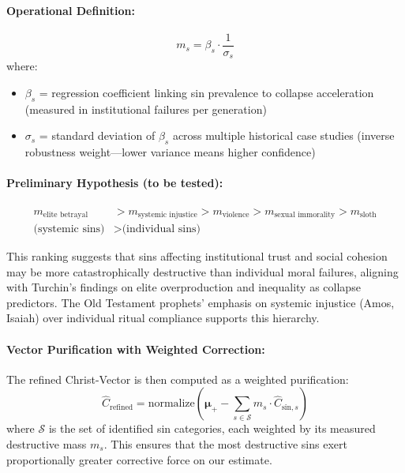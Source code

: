 \documentclass[11pt,a4paper]{article}
\theoremstyle{definition}
\theoremstyle{remark}
\begin{document}
\begin{small}
\paragraph{Operational Definition:}
\begin{equation}
m_s = \beta_s \cdot \frac{1}{\sigma_s}
\end{equation}
where:
\begin{itemize}
    \item \(\beta_s\) = regression coefficient linking sin prevalence to collapse acceleration (measured in institutional failures per generation)
    \item \(\sigma_s\) = standard deviation of \(\beta_s\) across multiple historical case studies (inverse robustness weight—lower variance means higher confidence)
\end{itemize}

\paragraph{Preliminary Hypothesis (to be tested):}
\begin{align}
m_{\text{elite betrayal}} &> m_{\text{systemic injustice}} > m_{\text{violence}} > m_{\text{sexual immorality}} > m_{\text{sloth}} \\
\text{(systemic sins)} &> \text{(individual sins)}
\end{align}

This ranking suggests that sins affecting institutional trust and social cohesion may be more catastrophically destructive than individual moral failures, aligning with Turchin's findings on elite overproduction and inequality as collapse predictors. The Old Testament prophets' emphasis on systemic injustice (Amos, Isaiah) over individual ritual compliance supports this hierarchy.

\paragraph{Vector Purification with Weighted Correction:}

The refined Christ-Vector is then computed as a weighted purification:
\begin{equation}
\hat{C}_{\text{refined}} = \text{normalize}\left(\boldsymbol{\mu}_+ - \sum_{s \in \mathcal{S}} m_s \cdot \hat{C}_{\text{sin}, s}\right)
\end{equation}
where \(\mathcal{S}\) is the set of identified sin categories, each weighted by its measured destructive mass \(m_s\). This ensures that the most destructive sins exert proportionally greater corrective force on our estimate.


\end{small}
\end{document}
